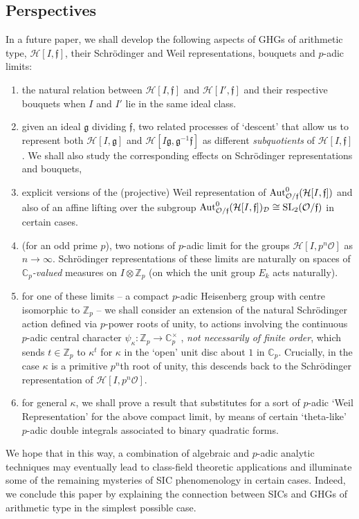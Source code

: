 \documentclass[12pt]{article}
\newcommand{\Aut}{{\rm Aut}}
\newcommand{\bbC}{\ensuremath{\mathbb{C}}}\newcommand{\bbCp}{\ensuremath{\mathbb{C}_p}}
\newcommand{\bbZ}{\ensuremath{\mathbb{Z}}}
\newcommand{\cD}{\ensuremath{\mathcal{D}}}
\newcommand{\cH}{\ensuremath{\mathcal{H}}}
\newcommand{\cO}{\ensuremath{\mathcal{O}}}
\newcommand{\ff}{\ensuremath{\mathfrak{f}}}
\newcommand{\fg}{\ensuremath{\mathfrak{g}}}
\newcommand{\inv}{^{-1}}%
\newcommand{\SL}{{\rm SL}}
\newcommand{\Of}{{\cO/\ff}}
\begin{document}
\subsection{Perspectives}\label{subsec:perspectives} In a future paper, we shall develop the following aspects of GHGs of arithmetic type, $\cH[I,\ff]$, their Schr\"odinger and Weil representations, bouquets and $p$-adic limits:
\begin{enumerate}
	\item the natural relation between $\cH[I,\ff]$ and 
	$\cH[I',\ff]$ and their respective bouquets when $I$ and $I'$ lie in the same ideal class.
	\item given an ideal  $\fg$ dividing $\ff$, two related processes of `descent' that allow us to represent both $\cH[I,\fg]$ and $\cH[I\fg,\fg\inv\ff]$ as different \textit{subquotients} of $\cH[I,\ff]$. We shall also study the corresponding effects on Schr\"odinger representations and bouquets, 
	\item  explicit versions of the (projective) Weil representation of $\Aut^0_\Of(\cH[I,\ff])$ and also of an affine lifting over the subgroup $\Aut^0_\Of(\cH[I,\ff])_\cD\cong \SL_2(\cO/\ff)$ in certain cases. 
	\item\label{part:rem further directions1} (for an odd prime $p$), two notions of $p$-adic limit for the groups $\cH[I,p^n\cO]$ as $n\rightarrow \infty$. Schr\"odinger representations of these limits are naturally on spaces of \textit{$\bbC_p$-valued} measures on $I\otimes\bbZ_p$ (on which the unit group $E_k$ acts naturally). 
	\item for one of these limits -- a compact $p$-adic Heisenberg group with centre isomorphic to $\bbZ_p$ -- we shall consider  an extension of the natural Schr\"odinger action defined via $p$-power roots of unity, to actions involving the continuous $p$-adic central character   $\psi_\kappa:\bbZ_p\rightarrow \bbC_p^\times$ , \textit{not necessarily of finite order}, which sends $t\in\bbZ_p$ to $\kappa^t$ for $\kappa$ in the `open' unit disc about $1$ in $\bbC_p$. Crucially, in the case $\kappa$ is a primitive $p^n$th root of unity, this descends back to the Schr\"odinger representation of $\cH[I, p^n\cO]$.   
	\item for general $\kappa$, we shall prove a result that substitutes for a sort of $p$-adic `Weil Representation' for the above compact limit, by means of certain `theta-like' $p$-adic double integrals associated to binary quadratic forms. 
\end{enumerate}
We hope that in this way, a combination of algebraic and $p$-adic analytic techniques may eventually lead to class-field theoretic applications and illuminate 
some of the remaining mysteries of SIC phenomenology in certain cases. Indeed, we  conclude this paper by explaining the connection between SICs and GHGs of arithmetic type in the simplest possible case.  
\end{document}
